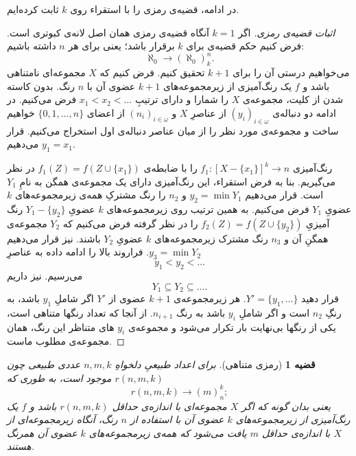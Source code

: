\documentclass[12pt,a4paper]{report}
\theoremstyle{colorhead}
\newtheorem{thm}{قضیه}
\begin{document}
در ادامه، قضیه‌ی رمزی را با استقراء روی
$k$
ثابت کرده‌ایم.
\begin{proof}[اثبات قضیه‌ی رمزی]
	اگر
	$k=1$
	آنگاه قضیه‌ی رمزی همان اصل لانه‌ی کبوتری است. فرض کنیم حکم قضیه‌ی برای $k$ برقرار باشد؛ یعنی برای هر
	$n$
	داشته باشیم:
	\[
	\aleph_0\to (\aleph_0)^n_k.
	\]
	می‌خواهیم درستی آن را برای
	$k+1$
	تحقیق کنیم. 
فرض کنیم که
$X$
مجموعه‌ای نامتناهی باشد و
$f$
یک رنگ‌آمیزی از زیرمجموعه‌های
$k+1$
عضوی آن با 
$n$
رنگ. بدون کاسته شدن از کلیت، مجموعه‌ی
$X$
را شمارا و دارای ترتیبِ
$x_1<x_2<\ldots $
 فرض می‌کنیم. 
 در ادامه دو دنباله‌ی
 $(y_i)_{i\in \omega}$
 از عناصرِ
 $X$
 و
  $(n_i)_{i\in \omega}$
  از اعضای
 $\{0,1,\ldots,n\}$
 خواهیم ساخت و مجموعه‌ی مورد نظر را از میان عناصر دنباله‌ی اول استخراج می‌کنیم. قرار می‌دهیم
 $y_1=x_1$.
 \par 
 رنگ‌آمیزی
 $f_1:[X-\{x_1\}]^k\to n$
را با ضابطه‌ی
$f_1(Z)=f(Z\cup \{x_1\})$
در نظر می‌گیریم.
بنا به فرض استقراء، 
این رنگ‌آمیزی دارای یک مجموعه‌ی همگن به نامِ
$Y_1$
است. قرار می‌دهیم
$y_2=\min Y_1$
و
$n_2$
را رنگ مشترکِ همه‌ی زیرمجموعه‌های
$k$
عضویِ
$Y_1$
فرض می‌کنیم. به همین ترتیب روی
زیرمجموعه‌های
$k$
عضویِ
$Y_1-\{y_2\}$
رنگ آمیزیِ
$f_2(Z)=f(Z\cup \{y_2\})$
را در نظر گرفته فرض می‌کنیم که 
$Y_2$
مجموعه‌ی همگنِ آن و 
$n_3$
رنگ مشترک زیرمجموعه‌های
$k$
عضویِ
$Y_2$
 باشند. نیز قرار می‌دهیم
 $y_3=\min Y_2$.
 فراروند بالا را ادامه داده به عناصرِ
 \[
 y_1<y_2<\ldots
 \]
 می‌رسیم.
 نیز داریم
 \[
 Y_1\subseteq Y_2\subseteq \ldots.
 \]
 قرار دهید
 $Y'=\{y_1,\ldots\}$.
 هر زیرمجموعه‌ی
 $k+1$
 عضوی از
 $Y'$
 اگر شاملِ
 $y_1$
 باشد، به رنگِ
 $n_2$
 است و اگر شاملِ
 $y_i$
 باشد به رنگ 
 $n_{i+1}$.
از آنجا که تعداد رنگها متناهی است، یکی از رنگها بی‌نهایت بار تکرار می‌شود  و
مجموعه‌ی
$y_i$
های متناظر این رنگ، همان مجموعه‌ی مطلوب ماست.
	\end{proof}
\begin{thm}[رمزی متناهی]
برای  اعداد طبیعیِ
دلخواهِ
$n,m,k$
عددی طبیعی چون
$r(n,m,k)$
موجود است،‌ به طوری 
که
\[
r(n,m,k)\to (m)^k_n;
\]
یعنی 
بدان گونه که اگر 
$X$
مجموعه‌ای با اندازه‌ی حداقل
$r(n,m,k)$
باشد و 
$f$
یک رنگ‌آمیزی از زیرمجموعه‌های
$k$
عضوی آن با استفاده از
$n$
رنگ، آنگاه زیرمجموعه‌ای
از 
$X$
با اندازه‌ی حداقل
$m$
یافت می‌شود که همه‌ی زیرمجموعه‌های 
$k$
عضوی آن همرنگ هستند. 
\end{thm}
\end{document}
